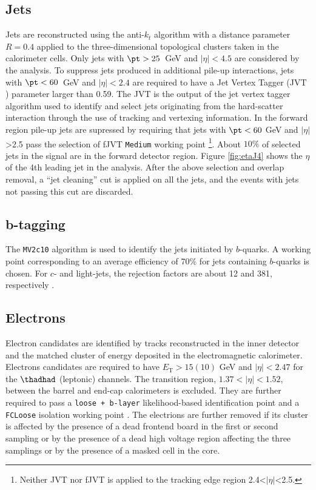 \subsection{Jets}
Jets are reconstructed using the anti-$k_t$ algorithm \cite{antikt} with a distance parameter $R=0.4$ applied to the three-dimensional topological clusters taken in the calorimeter cells. Only jets with $\pt>25$~GeV and $|\eta|<4.5$ are considered by the analysis. To suppress jets produced in additional pile-up interactions, jets with $\pt<60$~GeV and $|\eta|<2.4$ are required to have a Jet Vertex Tagger (JVT \cite{JVT}) parameter larger than 0.59. The JVT is the output of the jet vertex tagger algorithm used to identify and select jets originating from the hard-scatter interaction through the use of tracking and vertexing information. In the forward region pile-up jets are supressed by requiring that jets with $\pt < 60$ GeV and $|\eta|$>2.5 pass the selection of fJVT \texttt{Medium} working point \cite{fJVT}\footnote{Neither JVT nor fJVT is applied to the tracking edge region 2.4<$|\eta|$<2.5.}. About $10\%$ of selected jets in the signal are in the forward detector region. Figure \ref{fig:etaJ4} shows the $\eta$ of the 4th leading jet in the analysis. After the above selection and overlap removal, a ``jet cleaning'' cut is applied on all the jets, and the events with jets not passing this cut are discarded.

\subsection{b-tagging}
The {\tt\scriptsize MV2c10} \cite{btag1} algorithm is used to identify the jets initiated by $b$-quarks. A working point corresponding to an average efficiency of 70\% for jets containing $b$-quarks is chosen. For $c$- and light-jets, the rejection factors are about 12 and 381, respectively \cite{btag2}.

\subsection{Electrons}
Electron candidates are identified by tracks reconstructed in the inner detector and the matched cluster of energy deposited in the electromagnetic calorimeter. Electrons candidates are required to have $E_{\text{T}} > 15 (10)$ GeV and $|\eta|<2.47$ for the $\thadhad$ (leptonic) channels. The transition region, $1.37<|\eta|<1.52$, between the barrel and end-cap calorimeters is excluded. They are further required to pass a \texttt{loose + b-layer} likelihood-based identification point \cite{ElectronID} and a \texttt{FCLoose} isolation working point \cite{IsolationWP}. The electrions are further removed  if its cluster is affected by the presence of a dead frontend board in the first or second sampling or by the presence of a dead high voltage region affecting the three samplings or by the presence of a masked cell in the core.

